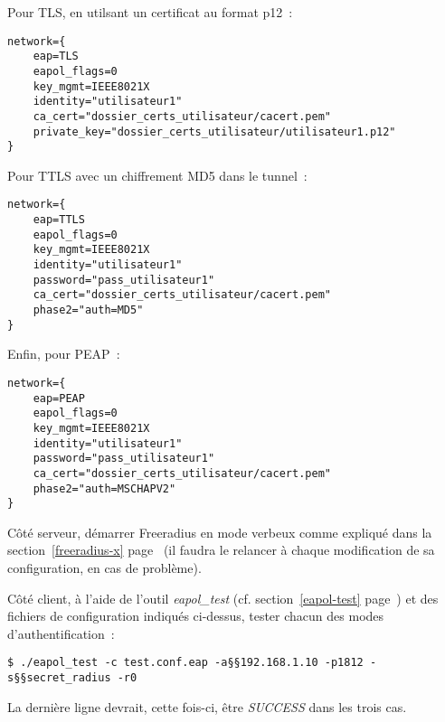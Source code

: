 Pour TLS, en utilsant un certificat au format p12~: 

\begin{lstlisting}
network={
    eap=TLS
    eapol_flags=0
    key_mgmt=IEEE8021X
    identity="utilisateur1"
    ca_cert="dossier_certs_utilisateur/cacert.pem"
    private_key="dossier_certs_utilisateur/utilisateur1.p12"
}
\end{lstlisting}

Pour TTLS avec un chiffrement MD5 dans le tunnel~:

\begin{lstlisting}
network={
    eap=TTLS
    eapol_flags=0
    key_mgmt=IEEE8021X
    identity="utilisateur1"
    password="pass_utilisateur1"
    ca_cert="dossier_certs_utilisateur/cacert.pem"
    phase2="auth=MD5"
}
\end{lstlisting}

Enfin, pour PEAP~:

\begin{lstlisting}
network={
    eap=PEAP
    eapol_flags=0
    key_mgmt=IEEE8021X
    identity="utilisateur1"
    password="pass_utilisateur1"
    ca_cert="dossier_certs_utilisateur/cacert.pem"
    phase2="auth=MSCHAPV2"
}
\end{lstlisting}

Côté serveur, démarrer Freeradius en mode verbeux comme expliqué dans la section~\ref{freeradius-x} page~\pageref{freeradius-x} (il faudra le relancer à chaque modification de sa configuration, en cas de problème).

Côté client, à l'aide de l'outil \emph{eapol\_test} (cf. section~\ref{eapol-test} page~\pageref{eapol-test}) et des fichiers de configuration indiqués ci-dessus, tester chacun des modes d'authentification~:

\begin{lstlisting}
$ ./eapol_test -c test.conf.eap -a§§192.168.1.10 -p1812 -s§§secret_radius -r0
\end{lstlisting}

La dernière ligne devrait, cette fois-ci, être \emph{SUCCESS} dans les trois cas.
